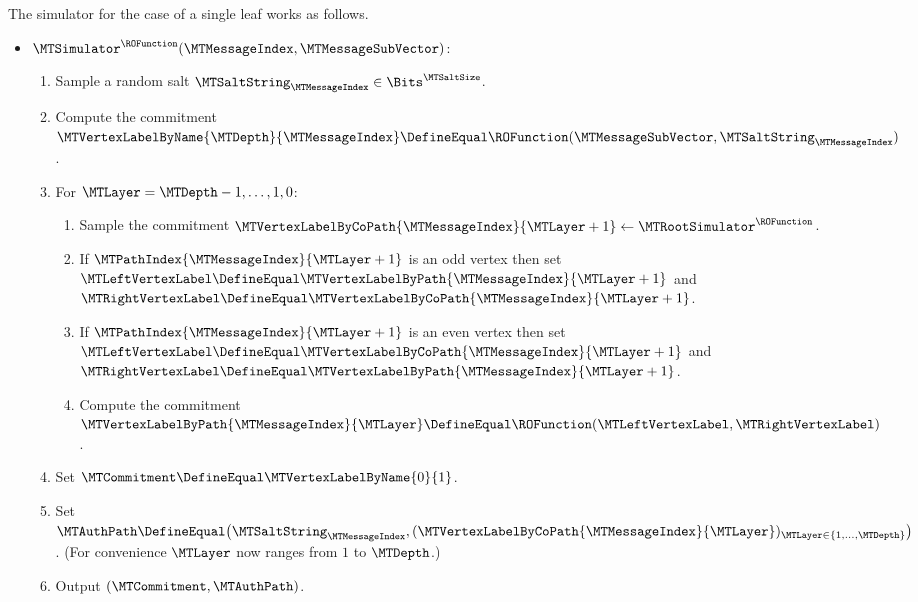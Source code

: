 \begin{construction}
\label{construction:mt-simulator-single-leaf}
The simulator for the case of a single leaf works as follows.
\begin{itemize}

  \item[] $\MTSimulator^{\ROFunction}(\MTMessageIndex,\MTMessageSubVector)$:
  \begin{enumerate}[nolistsep]

    \item Sample a random salt $\MTSaltString_{\MTMessageIndex} \in \Bits^{\MTSaltSize}$.

    \item Compute the commitment $\MTVertexLabelByName{\MTDepth}{\MTMessageIndex} \DefineEqual \ROFunction(\MTMessageSubVector,\MTSaltString_{\MTMessageIndex})$.

    \item For $\MTLayer = \MTDepth-1,\dots,1,0$:
    \begin{enumerate}[nolistsep]

      \item Sample the commitment $\MTVertexLabelByCoPath{\MTMessageIndex}{\MTLayer+1} \gets \MTRootSimulator^{\ROFunction}$.

      \item If $\MTPathIndex{\MTMessageIndex}{\MTLayer+1}$ is an odd vertex then set $\MTLeftVertexLabel \DefineEqual \MTVertexLabelByPath{\MTMessageIndex}{\MTLayer+1}$ and $\MTRightVertexLabel \DefineEqual \MTVertexLabelByCoPath{\MTMessageIndex}{\MTLayer+1}$.

      \item If $\MTPathIndex{\MTMessageIndex}{\MTLayer+1}$ is an even vertex then set $\MTLeftVertexLabel \DefineEqual \MTVertexLabelByCoPath{\MTMessageIndex}{\MTLayer+1}$ and $\MTRightVertexLabel \DefineEqual \MTVertexLabelByPath{\MTMessageIndex}{\MTLayer+1}$.

      \item Compute the commitment $\MTVertexLabelByPath{\MTMessageIndex}{\MTLayer} \DefineEqual \ROFunction(\MTLeftVertexLabel,\MTRightVertexLabel)$.

    \end{enumerate}

    \item Set $\MTCommitment \DefineEqual \MTVertexLabelByName{0}{1}$.

    \item Set $\MTAuthPath \DefineEqual \big(\MTSaltString_{\MTMessageIndex},(\MTVertexLabelByCoPath{\MTMessageIndex}{\MTLayer})_{\MTLayer \in \{1,\dots,\MTDepth\}}\big)$. (For convenience $\MTLayer$ now ranges from $1$ to $\MTDepth$.)

    \item Output $(\MTCommitment,\MTAuthPath)$.

  \end{enumerate}

\end{itemize}
\end{construction}

